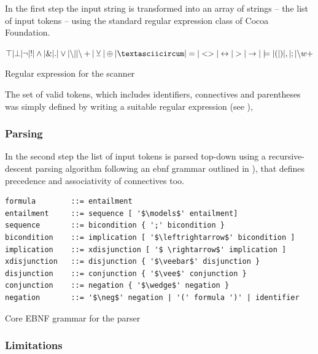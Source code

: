 In the first step the input string is transformed into an array of strings – the list of input tokens –
using the standard regular expression class of Cocoa Foundation.
\begin{table}[htdp]
\begin{center}
$\top | \bot 
| \neg | !
| \wedge | \& | .
| \vee | {\setminus}| | {\setminus}+ 
| \veebar | \oplus | \textasciicircum
| = | <> | \leftrightarrow 
| > | \rightarrow | \models
| ( | ) | , | ; 
| {\setminus}w+$ 
\caption{Regular expression for the scanner}
\label{tab:REGEX}
\end{center}
\end{table}

The set of valid tokens, which includes identifiers, connectives and parentheses
was simply defined by writing a suitable regular expression (see ), 

\subsubsection{Parsing}

In the second step the list of input tokens is parsed top-down 
using a recursive-descent parsing algorithm \cite[p.144ff]{Louden:1997:CCP:523017} 
following an ebnf grammar outlined in ), 
that defines precedence and associativity of connectives too.

\begin{table}[htdp]
\begin{center}
\begin{lstlisting}[mathescape]
formula        ::= entailment
entailment     ::= sequence [ '$\models$' entailment]
sequence       ::= bicondition { ';' bicondition } 
bicondition    ::= implication [ '$\leftrightarrow$' bicondition ]
implication    ::= xdisjunction [ '$ \rightarrow$' implication ]
xdisjunction   ::= disjunction { '$\veebar$' disjunction }
disjunction    ::= conjunction { '$\vee$' conjunction }
conjunction    ::= negation { '$\wedge$' negation }
negation       ::= '$\neg$' negation | '(' formula ')' | identifier
\end{lstlisting}
\caption{Core EBNF grammar for the parser}
\label{tab:CoreEBNF}
\end{center}
\end{table}

\subsubsection{Limitations}

